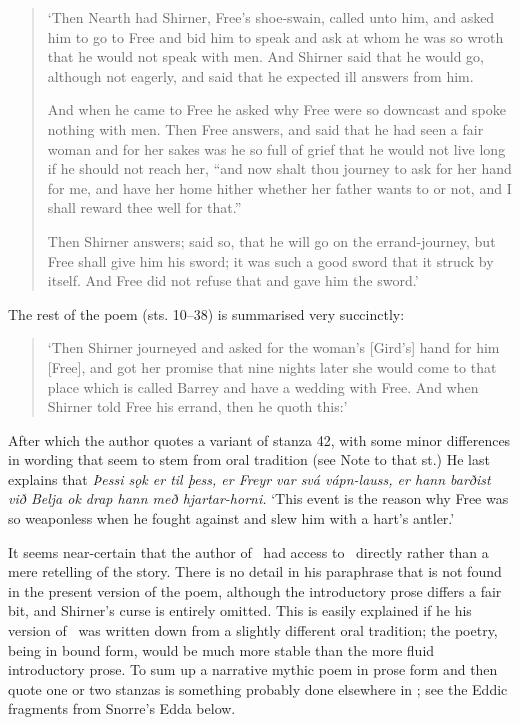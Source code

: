 \begin{quote}‘Then Nearth had Shirner, Free’s shoe-swain, called unto him, and asked him to go to Free and bid him to speak and ask at whom he was so wroth that he would not speak with men.  And Shirner said that he would go, although not eagerly, and said that he expected ill answers from him.

And when he came to Free he asked why Free were so downcast and spoke nothing with men.  Then Free answers, and said that he had seen a fair woman and for her sakes was he so full of grief that he would not live long if he should not reach her, “and now shalt thou journey to ask for her hand for me, and have her home hither whether her father wants to or not, and I shall reward thee well for that.”

Then Shirner answers; said so, that he will go on the errand-journey, but Free shall give him his sword; it was such a good sword that it struck by itself.  And Free did not refuse that and gave him the sword.’\end{quote}

The rest of the poem (sts. 10–38) is summarised very succinctly:

\begin{quote}‘Then Shirner journeyed and asked for the woman’s [Gird’s] hand for him [Free], and got her promise that nine nights later she would come to that place which is called Barrey and have a wedding with Free.  And when Shirner told Free his errand, then he quoth this:’\end{quote}

After which the author quotes a variant of stanza 42, with some minor differences in wording that seem to stem from oral tradition (see Note to that st.)  He last explains that \emph{Þessi sǫk er til þess, er Freyr var svá vápn-lauss, er hann barðist við Belja ok drap hann með hjartar-horni.} ‘This event is the reason why Free was so weaponless when he fought against  and slew him with a hart’s antler.’

It seems near-certain that the author of \Gylfaginning\ had access to \Skirnismal\ directly rather than a mere retelling of the story.  There is no detail in his paraphrase that is not found in the present version of the poem, although the introductory prose differs a fair bit, and Shirner’s curse is entirely omitted.  This is easily explained if he his version of \Skirnismal\ was written down from a slightly different oral tradition; the poetry, being in bound form, would be much more stable than the more fluid introductory prose.  To sum up a narrative mythic poem in prose form and then quote one or two stanzas is something probably done elsewhere in \Gylfaginning; see the Eddic fragments from Snorre’s Edda below.

